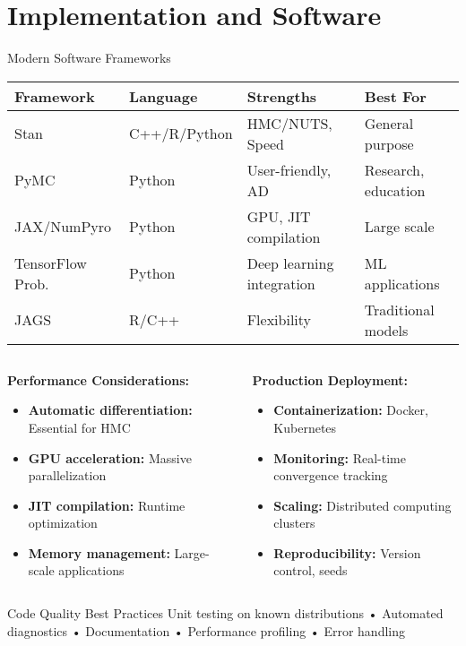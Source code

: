 \documentclass[aspectratio=169,11pt]{beamer}
\begin{document}
\section{Implementation and Software}

\begin{frame}{Modern Software Frameworks}
\begin{table}
\centering
\small
\begin{tabular}{p{2cm}p{3cm}p{4cm}p{2cm}}
\toprule
\textbf{Framework} & \textbf{Language} & \textbf{Strengths} & \textbf{Best For} \\
\midrule
Stan & C++/R/Python & HMC/NUTS, Speed & General purpose \\
PyMC & Python & User-friendly, AD & Research, education \\
JAX/NumPyro & Python & GPU, JIT compilation & Large scale \\
TensorFlow Prob. & Python & Deep learning integration & ML applications \\
JAGS & R/C++ & Flexibility & Traditional models \\
\bottomrule
\end{tabular}
\end{table}

\begin{columns}
\begin{column}{0.5\textwidth}
\textbf{Performance Considerations:}
\begin{itemize}
\item \textbf{Automatic differentiation:} Essential for HMC
\item \textbf{GPU acceleration:} Massive parallelization
\item \textbf{JIT compilation:} Runtime optimization
\item \textbf{Memory management:} Large-scale applications
\end{itemize}
\end{column}
\begin{column}{0.5\textwidth}
\textbf{Production Deployment:}
\begin{itemize}
\item \textbf{Containerization:} Docker, Kubernetes
\item \textbf{Monitoring:} Real-time convergence tracking
\item \textbf{Scaling:} Distributed computing clusters
\item \textbf{Reproducibility:} Version control, seeds
\end{itemize}
\end{column}
\end{columns}

\vspace{0.3cm}
\begin{alertblock}{Code Quality Best Practices}
Unit testing on known distributions • Automated diagnostics • Documentation • Performance profiling • Error handling
\end{alertblock}
\end{frame}
\end{document}
